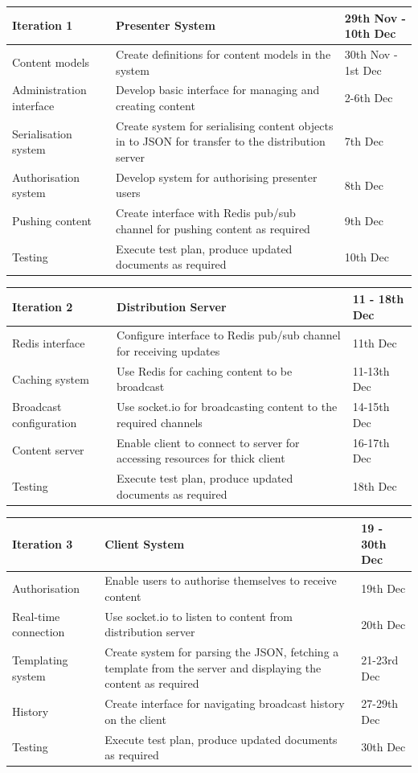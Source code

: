 \documentclass[a4papert,11pt,notitlepage]{ltxdoc}
\begin{document}
\begin{tabular}{p{5cm} p{7cm} p{4cm}}
\hline
Iteration 1 & Presenter System & 29th Nov - 10th Dec \\
\hline
Content models & Create definitions for content models in the system & 30th Nov - 1st Dec \\
Administration interface & Develop basic interface for managing and creating content & 2-6th Dec \\
Serialisation system & Create system for serialising content objects in to JSON for transfer to the distribution server & 7th Dec \\
Authorisation system & Develop system for authorising presenter users & 8th Dec \\
Pushing content & Create interface with Redis pub/sub channel for pushing content as required & 9th Dec \\
Testing & Execute test plan, produce updated documents as required & 10th Dec \\
\end{tabular}

\begin{tabular}{p{5cm} p{7cm} p{4cm}}
\hline
Iteration 2 & Distribution Server & 11 - 18th Dec \\
\hline
Redis interface & Configure interface to Redis pub/sub channel for receiving updates & 11th Dec \\
Caching system & Use Redis for caching content to be broadcast & 11-13th Dec \\
Broadcast configuration & Use socket.io for broadcasting content to the required channels & 14-15th Dec \\
Content server & Enable client to connect to server for accessing resources for thick client & 16-17th Dec \\
Testing & Execute test plan, produce updated documents as required & 18th Dec \\
\end{tabular}

\begin{tabular}{p{5cm} p{7cm} p{4cm}}
\hline
Iteration 3 & Client System & 19 - 30th Dec \\
\hline
Authorisation & Enable users to authorise themselves to receive content & 19th Dec \\
Real-time connection & Use socket.io to listen to content from distribution server & 20th Dec \\
Templating system & Create system for parsing the JSON, fetching a template from the server and displaying the content as required & 21-23rd Dec \\
History & Create interface for navigating broadcast history on the client & 27-29th Dec \\
Testing & Execute test plan, produce updated documents as required & 30th Dec \\
\end{tabular}
\end{document}
